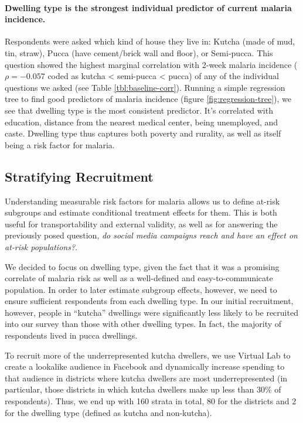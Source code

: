 \documentclass[a4paper,12pt]{article}
\begin{document}
\paragraph{Dwelling type is the strongest individual predictor of current malaria incidence.} Respondents were asked which kind of house they live in: Kutcha (made of mud, tin, straw), Pucca (have cement/brick wall and floor), or Semi-pucca. This question showed the highest marginal correlation with 2-week malaria incidence ($\rho = -0.057$ coded as kutcha < semi-pucca < pucca) of any of the individual questions we asked (see Table \ref{tbl:baseline-corr}). Running a simple regression tree to find  good predictors of malaria incidence (figure \ref{fig:regression-tree}), we see that dwelling type is the most consistent predictor. It's correlated with education, distance from the nearest medical center, being unemployed, and caste. Dwelling type thus captures both poverty and rurality, as well as itself being a risk factor for malaria.






\subsection{Stratifying Recruitment}

Understanding measurable risk factors for malaria allows us to define at-risk subgroups and estimate conditional treatment effects for them. This is both useful for transportability and external validity, as well as for answering the previously posed question, \textit{do social media campaigns reach and have an effect on at-risk populations?}.

We decided to focus on dwelling type, given the fact that it was a promising correlate of malaria risk as well as a well-defined and easy-to-communicate population. In order to later estimate subgroup effects, however, we need to ensure sufficient respondents from each dwelling type. In our initial recruitment, however, people in ``kutcha'' dwellings were significantly less likely to be recruited into our survey than those with other dwelling types. In fact, the majority of respondents lived in pucca dwellings.

To recruit more of the underrepresented kutcha dwellers, we use Virtual Lab to create a lookalike audience in Facebook and dynamically increase spending to that audience in districts where kutcha dwellers are most underrepresented (in particular, those districts in which kutcha dwellers make up less than 30\% of respondents). Thus, we end up with 160 strata in total, 80 for the districts and 2 for the dwelling type (defined as kutcha and non-kutcha).
\end{document}

